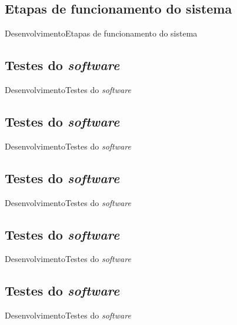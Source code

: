 \subsection{Etapas de funcionamento do sistema}
\begin{frame}{Desenvolvimento}{Etapas de funcionamento do sistema}

\end{frame}

\subsection{Testes do \textit{software}}
\begin{frame}{Desenvolvimento}{Testes do \textit{software}}

\end{frame}

\subsection{Testes do \textit{software}}
\begin{frame}{Desenvolvimento}{Testes do \textit{software}}

\end{frame}

\subsection{Testes do \textit{software}}
\begin{frame}{Desenvolvimento}{Testes do \textit{software}}

\end{frame}

\subsection{Testes do \textit{software}}
\begin{frame}{Desenvolvimento}{Testes do \textit{software}}

\end{frame}

\subsection{Testes do \textit{software}}
\begin{frame}{Desenvolvimento}{Testes do \textit{software}}

\end{frame}

